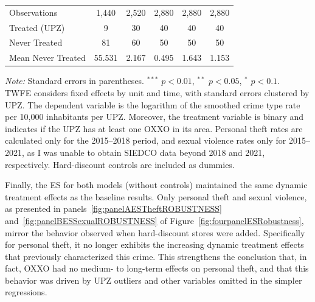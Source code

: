 \documentclass[12pt]{article}
\begin{document}
{\begin{landscape}
\begin{table}[p]
{\begin{tabular}{lcccccccccc}
            Observations & \multicolumn{2}{c}{1,440}         & \multicolumn{2}{c}{2,520}          & \multicolumn{2}{c}{2,880}         & \multicolumn{2}{c}{2,880}        & \multicolumn{2}{c}{2,880} \\
            Treated (UPZ)& \multicolumn{2}{c}{9}             & \multicolumn{2}{c}{30}             & \multicolumn{2}{c}{40}            & \multicolumn{2}{c}{40}           & \multicolumn{2}{c}{40} \\
            Never Treated& \multicolumn{2}{c}{81}            & \multicolumn{2}{c}{60}             & \multicolumn{2}{c}{50}            & \multicolumn{2}{c}{50}           & \multicolumn{2}{c}{50} \\
            Mean Never Treated& \multicolumn{2}{c}{55.531}   & \multicolumn{2}{c}{2.167}          & \multicolumn{2}{c}{0.495}         & \multicolumn{2}{c}{1.643}        & \multicolumn{2}{c}{1.153} \\

            \hline
            \end{tabular}
            }
            
            \vspace{1em}
            \begin{minipage}{\linewidth} 
                \footnotesize
                \textit{Note:} Standard errors in parentheses. $^{***}$ $p<0.01$, $^{**}$ $p<0.05$, $^{*}$ $p<0.1$. \\
                TWFE considers fixed effects by unit and time, with standard errors clustered by UPZ. 
                The dependent variable is the logarithm of the smoothed crime type rate per 10,000 inhabitants per UPZ. 
                Moreover, the treatment variable is binary and indicates if the UPZ has at least one OXXO in its area. 
                Personal theft rates are calculated only for the 2015–2018 period, and sexual violence rates only for 2015–2021, as I was unable to obtain SIEDCO data beyond 2018 and 2021, respectively.
                Hard-discount controls are included as dummies. 
            \end{minipage}
        \end{table}
    \end{landscape}
}

Finally, the ES for both models (without controls) maintained the same dynamic treatment effects as the baseline results. Only personal theft and sexual violence, as presented in panels~\ref{fig:panelAESTheftROBUSTNESS} and~\ref{fig:panelBESSexualROBUSTNESS} of Figure~\ref{fig:fourpanelESRobustness}, mirror the behavior observed when hard-discount stores were added. Specifically for personal theft, it no longer exhibits the increasing dynamic treatment effects that previously characterized this crime. This strengthens the conclusion that, in fact, OXXO had no medium- to long-term effects on personal theft, and that this behavior was driven by UPZ outliers and other variables omitted in the simpler regressions.
\end{document}
